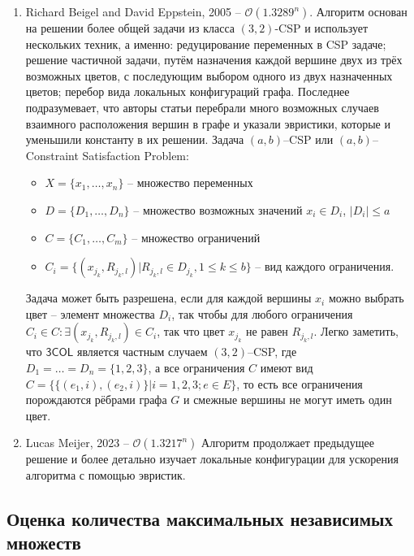 \documentclass{article}
\begin{document}
\begin{enumerate}
\item Richard Beigel and David Eppstein, 2005\cite{3} -- $\mathcal{O}(1.3289^n)$.
\newline
Алгоритм основан на решении более общей задачи из класса $(3, 2)$-CSP
и использует нескольких техник, а именно: редуцирование переменных в CSP задаче;
решение частичной задачи, путём назначения каждой вершине двух из трёх возможных цветов, с последующим выбором одного из двух назначенных цветов;
перебор вида локальных конфигураций графа.
Последнее подразумевает, что авторы статьи перебрали много возможных случаев взаимного расположения вершин в графе и указали эвристики, которые
и уменьшили константу в их решении.
\newline\newline
Задача $(a, b)$--CSP или $(a, b)$--Constraint Satisfaction Problem:
\begin{itemize}
    \item $X = \{x_1,\hdots, x_n\}$ -- множество переменных
    \item $D = \{D_1,\hdots, D_n\}$ -- множество возможных значений $x_i\in D_i$, $|D_i|\leq a$
    \item $C = \{C_1,\hdots, C_m\}$ -- множество ограничений
    \item $C_i = \{(x_{j_k}, R_{j_k, l})| R_{j_k, l}\in D_{j_k}, 1\leq k \leq b\}$ -- вид каждого ограничения.
\end{itemize}
Задача может быть разрешена, если для каждой вершины $x_i$ можно выбрать цвет -- элемент множества $D_i$, так чтобы для любого ограничения
$C_i\in C: \exists (x_{j_k}, R_{j_k, l})\in C_i$, так что цвет $x_{j_k}$ не равен $R_{j_k, l}$. Легко заметить, что $\mathsf{3COL}$ является частным
случаем $(3, 2)$--CSP, где $D_1=\hdots=D_n=\{1, 2, 3\}$, а все ограничения $C$ имеют вид $C=\{\{(e_1, i), (e_2, i)\}|i=1,2,3; e\in E\}$,
то есть все ограничения порождаются рёбрами графа $G$ и смежные вершины не могут иметь один цвет.

\item Lucas Meijer, 2023\cite{4} -- $\mathcal{O}(1.3217^n)$
\newline
Алгоритм продолжает предыдущее решение\cite{3} и более детально изучает локальные конфигурации для ускорения алгоритма с помощью эвристик.
\end{enumerate}

\setcounter{section}{2}
\setcounter{subsection}{0}

\subsection{Оценка количества максимальных независимых множеств}
\end{document}

